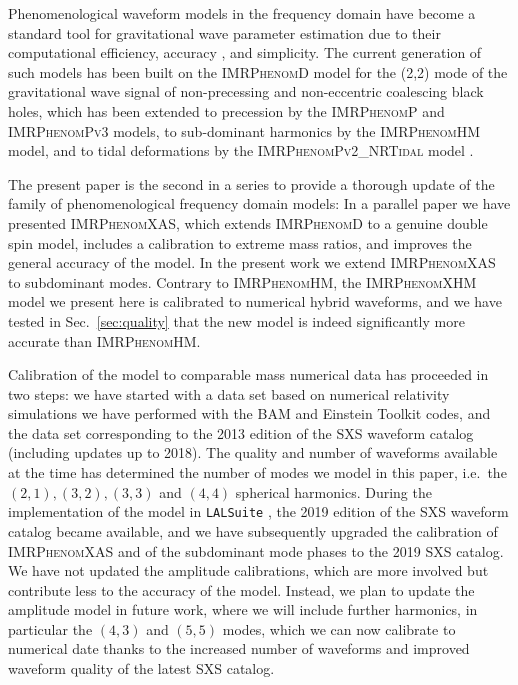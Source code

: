 \documentclass[twocolumn,prd,aps,superscriptaddress,preprintnumbers,tightenlines,showpacs,nofootinbib,eqsecnum,amsfonts,amsmath]{revtex4}
\newcommand{\phD}{\textsc{IMRPhenomD}\xspace}
\newcommand{\phX}{\textsc{IMRPhenomXAS}\xspace}
\newcommand{\phP}{\textsc{IMRPhenomP}\xspace}
\newcommand{\phHM}{\textsc{IMRPhenomHM}\xspace}
\newcommand{\phXHM}{\textsc{IMRPhenomXHM}\xspace}
\newcommand{\pvtwotidal}{\textsc{IMRPhenomPv2\_NRTidal}\xspace}
\newcommand{\pvthree}{\textsc{IMRPhenomPv3}\xspace}
\begin{document}
Phenomenological waveform models in the frequency domain have become a standard tool for gravitational wave parameter estimation \cite{LIGOScientific:2018mvr}
due to their computational efficiency, accuracy \cite{Kumar:2016dhh}, and simplicity. The current generation of such models has been built on the \phD model for the (2,2) mode of the gravitational wave signal of non-precessing and non-eccentric coalescing black holes, which has been extended to precession by the \phP \cite{Hannam:2013oca,PhenomPv2} and \pvthree \cite{Khan:2018fmp} models, to sub-dominant harmonics by the \phHM model, and to tidal deformations by the \pvtwotidal model \cite{Dietrich:2018uni,Dietrich:2019kaq}. 

The present paper is the second in a series to provide a thorough update of the family of phenomenological frequency domain models: In a parallel paper \cite{phenX} we have presented \phX, which extends \phD to a genuine double spin model, includes a calibration to extreme mass ratios, and improves the general accuracy of the model. In the present work we extend \phX to subdominant modes. Contrary to \phHM, the \phXHM model we present here is calibrated to numerical hybrid waveforms, and we have tested in Sec.~\ref{sec:quality} that the new model is indeed significantly more accurate than \phHM.

Calibration of the model to comparable mass numerical data has proceeded in two steps: we have started with a data set based on numerical relativity simulations we have performed with the BAM and Einstein Toolkit codes, and the data set corresponding to the 2013 edition of the SXS waveform catalog \cite{SXS:catalog} (including updates up to 2018). The quality and number of waveforms available at the time has determined the number of modes we model in this paper, i.e.~the $(2,1), (3,2), (3,3)$ and $(4,4)$ spherical harmonics.
%
During the implementation of the model in \texttt{LALSuite} \cite{lalsuite}, the 2019 edition of the SXS waveform catalog \cite{Boyle:2019kee} became available, and we have subsequently upgraded the calibration of \phX and of the subdominant mode phases to the 2019 SXS catalog.
%
We have not updated the amplitude calibrations, which are more involved but contribute less to the accuracy of the model. 
Instead, we plan to update the amplitude model in future work, where we will include further harmonics, in particular the $(4,3)$ and $(5,5)$ modes, which we can now calibrate to numerical date thanks to the increased number of waveforms and improved waveform quality of the latest SXS catalog.
\end{document}
